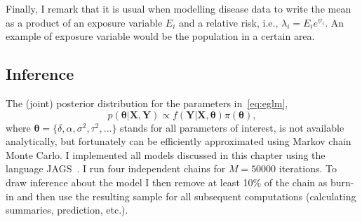 Finally, I remark that it is usual when modelling disease data to write the mean as a product of an exposure variable $E_i$ and a relative risk, i.e., $\lambda_i = E_i e^{\psi_i}$.
An example of exposure variable would be the population in a certain area.

\subsection{Inference}
\label{sec:mcmc}

The (joint) posterior distribution for the parameters in~\ref{eq:eglm},
\[ p(\boldsymbol\theta| \boldsymbol X, \boldsymbol Y ) \propto f(\boldsymbol Y | \boldsymbol X, \boldsymbol\theta)\pi(\boldsymbol\theta), \]
where $\boldsymbol\theta = \{ \delta, \alpha, \sigma^2, \tau^2, ...\}$ stands for all parameters of interest, is not available analytically, but fortunately can be efficiently approximated using Markov chain Monte Carlo.
I implemented all models discussed in this chapter using the language JAGS~\citep{Plummer2003}.
I run  four independent chains for $M=50000$ iterations.
To draw inference about the model I then remove at least 10\% of the chain as burn-in and then use the resulting sample for all subsequent computations (calculating summaries, prediction, etc.).

